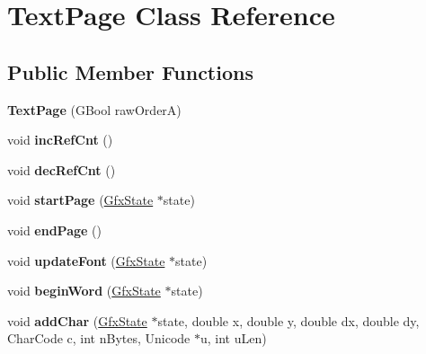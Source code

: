 \hypertarget{class_text_page}{}\section{Text\+Page Class Reference}
\label{class_text_page}
\subsection*{Public Member Functions}
\begin{DoxyCompactItemize}
\item 
\mbox{\label{class_text_page_a55a729b8baae4cd1cd2d5fd029af6efc}} 
{\bfseries Text\+Page} (G\+Bool raw\+OrderA)
\item 
\mbox{\label{class_text_page_a7dfe4fd4b171aa96c641bf4c468f5784}} 
void {\bfseries inc\+Ref\+Cnt} ()
\item 
\mbox{\label{class_text_page_a974b7d7f28d3ca7c56e9cd1bddcd0cc4}} 
void {\bfseries dec\+Ref\+Cnt} ()
\item 
\mbox{\label{class_text_page_a9a7b0c37059b904b8fee244a849a0664}} 
void {\bfseries start\+Page} (\hyperlink{class_gfx_state}{Gfx\+State} $\ast$state)
\item 
\mbox{\label{class_text_page_a1e2d7fd95577df569572fae188334b53}} 
void {\bfseries end\+Page} ()
\item 
\mbox{\label{class_text_page_aa2dfe8c6d42b7eafae37b9de9ce90e75}} 
void {\bfseries update\+Font} (\hyperlink{class_gfx_state}{Gfx\+State} $\ast$state)
\item 
\mbox{\label{class_text_page_a81bc3026f58c2fd8901a272f50ba8ac4}} 
void {\bfseries begin\+Word} (\hyperlink{class_gfx_state}{Gfx\+State} $\ast$state)
\item 
\mbox{\label{class_text_page_a8ed19d2f09de011fc33ab3b68444351d}} 
void {\bfseries add\+Char} (\hyperlink{class_gfx_state}{Gfx\+State} $\ast$state, double x, double y, double dx, double dy, Char\+Code c, int n\+Bytes, Unicode $\ast$u, int u\+Len)
\item 
\mbox{\label{class_text_page_a52c42aac9868792909dc65a816ac9e03}} 

\end{DoxyCompactItemize}
